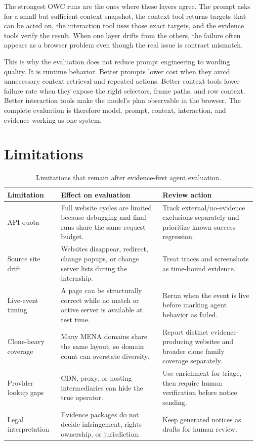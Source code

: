 The strongest OWC runs are the ones where these layers agree. The prompt asks for a
small but sufficient context snapshot, the context tool returns targets that can be
acted on, the interaction tool uses those exact targets, and the evidence tools verify
the result. When one layer drifts from the others, the failure often appears as a browser
problem even though the real issue is contract mismatch.

This is why the evaluation does not reduce prompt engineering to wording quality. It is
runtime behavior. Better prompts lower cost when they avoid unnecessary context retrieval
and repeated actions. Better context tools lower failure rate when they expose the right
selectors, frame paths, and row context. Better interaction tools make the model's plan
observable in the browser. The complete evaluation is therefore model, prompt, context,
interaction, and evidence working as one system.

\section{Limitations}

\begin{table}[!htbp]
\centering
\small
\begin{tabularx}{\textwidth}{Q{3.3cm}Y Y}
\toprule
{}
Limitation & Effect on evaluation & Review action \\
\midrule
API quota & Full website cycles are limited because debugging and final runs share the
same request budget. & Track external/no-evidence exclusions separately and prioritize
known-success regression. \\
Source site drift & Websites disappear, redirect, change popups, or change server
lists during the internship. & Treat traces and screenshots as time-bound evidence. \\
Live-event timing & A page can be structurally correct while no match or active server
is available at test time. & Rerun when the event is live before marking agent behavior
as failed. \\
Clone-heavy coverage & Many MENA domains share the same layout, so domain count can
overstate diversity. & Report distinct evidence-producing websites and broader clone
family coverage separately. \\
Provider lookup gaps & CDN, proxy, or hosting intermediaries can hide the true operator.
& Use enrichment for triage, then require human verification before notice sending. \\
Legal interpretation & Evidence packages do not decide infringement, rights ownership,
or jurisdiction. & Keep generated notices as drafts for human review. \\
\bottomrule
\end{tabularx}
\caption{Limitations that remain after evidence-first agent evaluation.}
\label{tab:eval-limitations}
\end{table}

